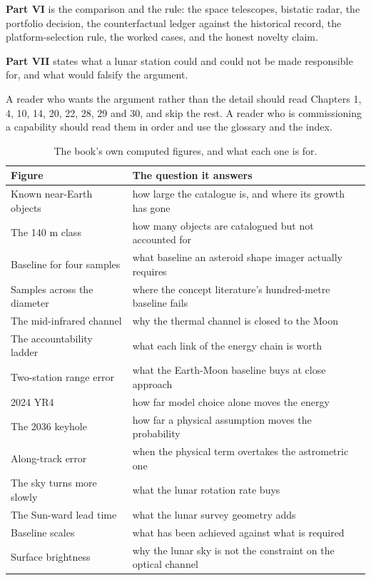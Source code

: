 \textbf{Part VI} is the comparison and the rule: the space telescopes, bistatic
radar, the portfolio decision, the counterfactual ledger against the
historical record, the platform-selection rule, the worked cases, and the
honest novelty claim.

\textbf{Part VII} states what a lunar station could and could not be made
responsible for, and what would falsify the argument.

A reader who wants the argument rather than the detail should read Chapters 1,
4, 10, 14, 20, 22, 28, 29 and 30, and skip the rest. A reader who is
commissioning a capability should read them in order and use the glossary and
the index.

\begin{table}[!htbp]
\centering
\small
\caption{The book's own computed figures, and what each one is for.}
\label{tab:figures}
\begin{tabularx}{\textwidth}{@{}P{2.57in}Y@{}}
\toprule
{}
\textbf{Figure} & \textbf{The question it answers} \\
\midrule
Known near-Earth objects & how large the catalogue is, and where its growth
has gone \\
The 140 m class & how many objects are catalogued but not accounted for \\
Baseline for four samples & what baseline an asteroid shape imager actually
requires \\
Samples across the diameter & where the concept literature's hundred-metre
baseline fails \\
The mid-infrared channel & why the thermal channel is closed to the Moon \\
The accountability ladder & what each link of the energy chain is worth \\
Two-station range error & what the Earth-Moon baseline buys at close approach \\
2024 YR4 & how far model choice alone moves the energy \\
The 2036 keyhole & how far a physical assumption moves the probability \\
Along-track error & when the physical term overtakes the astrometric one \\
The sky turns more slowly & what the lunar rotation rate buys \\
The Sun-ward lead time & what the lunar survey geometry adds \\
Baseline scales & what has been achieved against what is required \\
Surface brightness & why the lunar sky is not the constraint on the optical
channel \\
\bottomrule
\end{tabularx}
\end{table}
